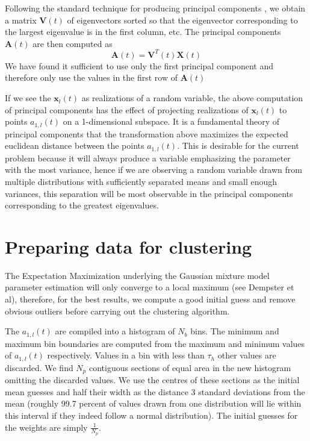 Following the standard technique for producing principal components
\cite[p.~11]{jolliffe2002principal}, we obtain a matrix $\mathbf{V}(t)$ of
eigenvectors sorted so that the eigenvector corresponding to the largest
eigenvalue is in the first column, etc.  The principal components
$\mathbf{A}(t)$ are then computed as
\begin{equation}
    \mathbf{A}(t) = \mathbf{V}^{T}(t)\mathbf{X}(t)
\end{equation}
We have found it sufficient to use only the first principal component and
therefore only use the values in the first row of $\mathbf{A}(t)$

If we see the $\mathbf{x}_{l}(t)$ as realizations of a random variable, the
above computation of principal components has the effect of projecting
realizations of $\mathbf{x}_{l}(t)$ to points $a_{1,l}(t)$ on a 1-dimensional
subspace. It is a fundamental theory of principal components that the
transformation above maximizes the expected euclidean distance between the
points $a_{1,l}(t)$. This is desirable for the current problem because it will
always produce a variable emphasizing the parameter with the most variance,
hence if we are observing a random variable drawn from multiple distributions
with sufficiently separated means and small enough variances, this separation
will be most observable in the principal components corresponding to the
greatest eigenvalues.

\section{Preparing data for clustering \label{sec:amfmseppreparecluster}}
The Expectation Maximization underlying the Gaussian mixture model parameter
estimation will only converge to a local maximum (see Dempster et al),
therefore, for the best results, we compute a good initial guess and remove
obvious outliers before carrying out the clustering algorithm.

The $a_{1,l}(t)$ are compiled into a histogram of $N_{b}$ bins. The minimum and
maximum bin boundaries are computed from the maximum and minimum values of
$a_{1,l}(t)$ respectively. Values in a bin with less than $\tau_{h}$ other
values are discarded. We find $N_{p}$ contiguous sections of equal area in the
new histogram omitting the discarded values.  We use the centres of these
sections as the initial mean guesses and half their width as the distance 3
standard deviations from the mean (roughly 99.7 percent of values drawn from one
distribution will lie within this interval if they indeed follow a normal
distribution). The initial guesses for the weights are simply $\frac{1}{N_{p}}$.


